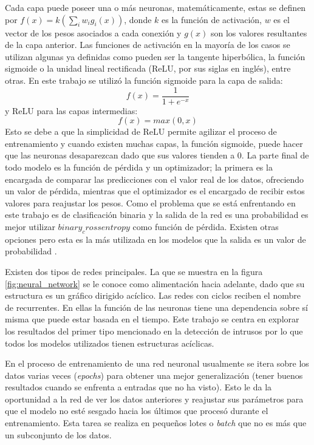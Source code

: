 Cada capa puede poseer una o más neuronas, matemáticamente, estas se definen por $f(x) = k(\sum_{i}w_{i}g_{i}(x))$, donde $k$ es la función de activación, $w$ es el vector de los pesos asociados a cada conexión y $g(x)$ son los valores resultantes de la capa anterior. Las funciones de activación en la mayoría de los casos se utilizan algunas ya definidas como pueden ser la tangente hiperbólica, la función sigmoide o la unidad lineal rectificada (ReLU, por sus siglas en inglés), entre otras. En este trabajo se utilizó la función sigmoide para la capa de salida: \[f(x) = \frac{1}{1 + e^{-x}}\] y ReLU para las capas intermedias: \[f(x)=max(0,x)\]
Esto se debe a que la simplicidad de ReLU permite agilizar el proceso de entrenamiento y cuando existen muchas capas, la función sigmoide, puede hacer que las neuronas desaparezcan dado que sus valores tienden a 0. La parte final de todo modelo es la función de pérdida y un optimizador; la primera es la encargada de comparar las predicciones con el valor real de los datos, ofreciendo un valor de pérdida, mientras que el optimizador es el encargado de recibir estos valores para reajustar los pesos. Como el problema que se está enfrentando en este trabajo es de clasificación binaria y la salida de la red es una probabilidad es mejor utilizar $binary_crossentropy$ como función de pérdida. Existen otras opciones pero esta es la más utilizada en los modelos que la salida es un valor de probabilidad \cite{10.5555/3203489}.

Existen dos tipos de redes principales. La que se muestra en la figura \ref{fig:neural_network} se le conoce como alimentación hacia adelante, dado que su estructura es un gráfico dirigido acíclico. Las redes con ciclos reciben el nombre de recurrentes. En ellas la función de las neuronas tiene una dependencia sobre s\'i misma que puede estar basada en el tiempo. Este trabajo se centra en explorar los resultados del primer tipo mencionado en la detección de intrusos por lo que todos los modelos utilizados tienen estructuras ac\'iclicas.

En el proceso de entrenamiento de una red neuronal usualmente se itera sobre los datos varias veces (\textit{epochs}) para obtener una mejor generalización (tener buenos resultados cuando se enfrenta a entradas que no ha visto). Esto le da la oportunidad a la red de ver los datos anteriores y reajustar sus parámetros para que el modelo no esté sesgado hacia los últimos que procesó durante el entrenamiento. Esta tarea se realiza en pequeños lotes o \textit{batch} que no es más que un subconjunto de los datos.

